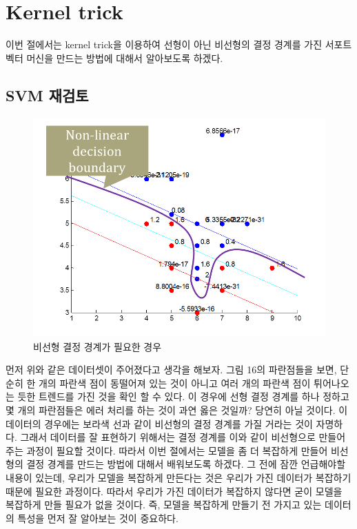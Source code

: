 \documentclass[a4paper]{oblivoir}
\begin{document}
\section{Kernel trick}
\indent 이번 절에서는 kernel trick을 이용하여 선형이 아닌 비선형의 결정 경계를 가진 서포트 벡터 머신을 만드는 방법에 대해서 알아보도록 하겠다.\\

\subsection{SVM 재검토}
\begin{figure}[ht]\centering
\includegraphics[scale=0.5]{ErrorSVM}\caption{비선형 결정 경계가 필요한 경우}\label{Fig:5-16}
\end{figure}
\indent 먼저 위와 같은 데이터셋이 주어졌다고 생각을 해보자. 그림 16의 파란점들을 보면, 단순히 한 개의 파란색 점이 동떨어져 있는 것이 아니고 여러 개의 파란색 점이 튀어나오는 듯한 트렌드를 가진 것을 확인 할 수 있다. 이 경우에 선형 결정 경계를 하나 정하고 몇 개의 파란점들은 에러 처리를 하는 것이 과연 옳은 것일까? 당연히 아닐 것이다. 이 데이터의 경우에는 보라색 선과 같이 비선형의 결정 경계를 가질 거라는 것이 자명하다. 그래서 데이터를 잘 표현하기 위해서는 결정 경계를 이와 같이 비선형으로 만들어주는 과정이 필요할 것이다. 따라서 이번 절에서는 모델을 좀 더 복잡하게 만들어 비선형의 결정 경계를 만드는 방법에 대해서 배워보도록 하겠다. 그 전에 잠깐 언급해야할 내용이 있는데, 우리가 모델을 복잡하게 만든다는 것은 우리가 가진 데이터가 복잡하기 때문에 필요한 과정이다. 따라서 우리가 가진 데이터가 복잡하지 않다면 굳이 모델을 복잡하게 만들 필요가 없을 것이다. 즉, 모델을 복잡하게 만들기 전 가지고 있는 데이터의 특성을 먼저 잘 알아보는 것이 중요하다.\\
\end{document}
